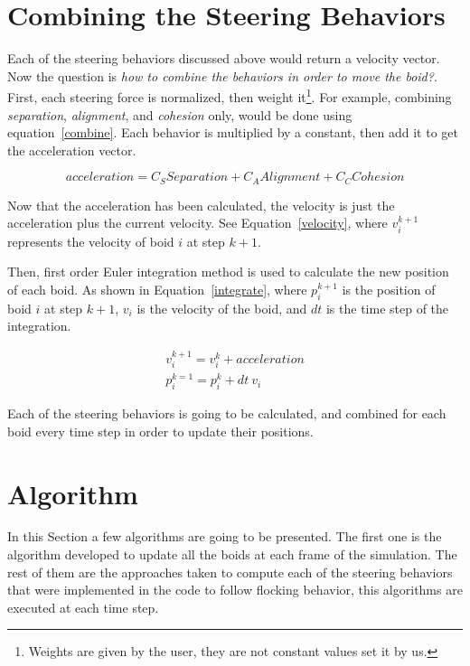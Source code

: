 \section{Combining the Steering Behaviors}
Each of the steering behaviors discussed above would return a velocity vector. Now the question is \textit{how to combine the behaviors in order to move the boid?}. First, each steering force is normalized, then weight it\footnote{Weights are given by the user, they are not constant values set it by us.}. For example, combining \textit{separation}, \textit{alignment}, and \textit{cohesion} only, would be done using equation~\ref{combine}. Each behavior is multiplied by a constant, then add it to get the acceleration vector.

\begin{equation}
\label{combine}
acceleration = C_S Separation  + C_A Alignment  + C_C Cohesion 
\end{equation}

Now that the acceleration has been calculated, the velocity is just the acceleration plus the current velocity. See Equation~\ref{velocity}, where $v_i^{k+1}$ represents the velocity of boid $i$ at step $k+1$. 

Then, first order Euler integration method is used  to calculate the new position of each boid. As shown in Equation~\ref{integrate}, where $p_i^{k+1}$ is the position of boid $i$ at step $k+1$, $v_i$ is the velocity of the boid, and $dt$ is the time step of the integration.

\begin{align}
\label{velocity}
v_i^{k+1} = v_i^k + acceleration\\
\label{integrate}
p_i^{k=1} = p_i^k + dt~ v_i
\end{align}

Each of the steering behaviors is going to be calculated, and combined for each boid every time step in order to update their positions.

\section{Algorithm}

In this Section a few algorithms are going to be presented. The first one is the algorithm developed to update all the boids at each frame of the simulation. The rest of them are the approaches taken to compute each of the steering behaviors that were implemented in the code to follow flocking behavior, this algorithms are executed at each time step.


